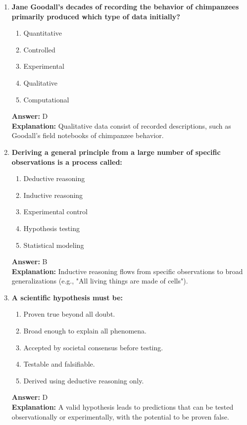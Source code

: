 \documentclass[11pt, a4paper]{article}
\begin{document}
\begin{enumerate}
\item \textbf{Jane Goodall's decades of recording the behavior of chimpanzees primarily produced which type of data initially?}
\begin{enumerate}[label=\Alph*.]
    \item Quantitative
    \item Controlled
    \item Experimental
    \item Qualitative
    \item Computational
\end{enumerate}
\textbf{Answer:} D \\
\textbf{Explanation:} Qualitative data consist of recorded descriptions, such as Goodall's field notebooks of chimpanzee behavior.

\item \textbf{Deriving a general principle from a large number of specific observations is a process called:}
\begin{enumerate}[label=\Alph*.]
    \item Deductive reasoning
    \item Inductive reasoning
    \item Experimental control
    \item Hypothesis testing
    \item Statistical modeling
\end{enumerate}
\textbf{Answer:} B \\
\textbf{Explanation:} Inductive reasoning flows from specific observations to broad generalizations (e.g., "All living things are made of cells").

\item \textbf{A scientific hypothesis must be:}
\begin{enumerate}[label=\Alph*.]
    \item Proven true beyond all doubt.
    \item Broad enough to explain all phenomena.
    \item Accepted by societal consensus before testing.
    \item Testable and falsifiable.
    \item Derived using deductive reasoning only.
\end{enumerate}
\textbf{Answer:} D \\
\textbf{Explanation:} A valid hypothesis leads to predictions that can be tested observationally or experimentally, with the potential to be proven false.


\end{enumerate}
\end{document}
